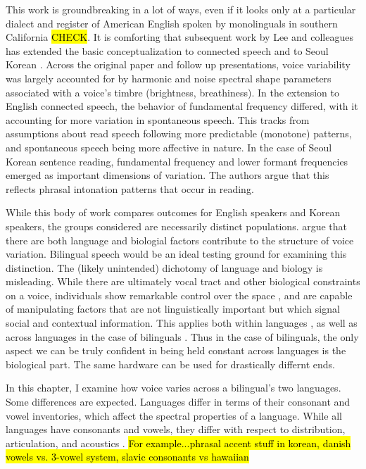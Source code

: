This work is groundbreaking in a lot of ways, even if it looks only at a particular dialect and register of American English spoken by monolinguals in southern California \hl{CHECK}. It is comforting that subsequent work by Lee and colleagues has extended the basic conceptualization to connected speech \citep{lee_2019_spontaneous} and to Seoul Korean \citep{lee_2020_language}. Across the original paper and follow up presentations, voice variability was largely accounted for by harmonic and noise spectral shape parameters associated with a voice's timbre (brightness, breathiness). In the extension to English connected speech, the behavior of fundamental frequency differed, with it accounting for more variation in spontaneous speech. This tracks from assumptions about read speech following more predictable (monotone) patterns, and spontaneous speech being more affective in nature. In the case of Seoul Korean sentence reading, fundamental frequency and lower formant frequencies emerged as important dimensions of variation. The authors argue that this reflects phrasal intonation patterns that occur in reading. 

While this body of work compares outcomes for English speakers and Korean speakers, the groups considered are necessarily distinct populations. \citet{lee_2020_language} argue that there are both language and biologial factors contribute to the structure of voice variation. Bilingual speech would be an ideal testing ground for examining this distinction. The (likely unintended) dichotomy of language and biology is misleading. While there are ultimately vocal tract and other biological constraints on a voice, individuals show remarkable control over the space \citep{}, and are capable of manipulating factors that are not linguistically important but which signal social and contextual information. This applies both within languages \citep{}, as well as across languages in the case of bilinguals \citep{bullock_2009_sociophonetics}. Thus in the case of bilinguals, the only aspect we can be truly confident in being held constant across languages is the biological part. The same hardware can be used for drastically differnt ends. 

In this chapter, I examine how voice varies across a bilingual's two languages. Some differences are expected. Languages differ in terms of their consonant and vowel inventories, which affect the spectral properties of a language. While all languages have consonants and vowels, they differ with respect to distribution, articulation, and acoustics . \hl{For example...phrasal accent stuff in korean, danish vowels vs. 3-vowel system, slavic consonants vs hawaiian} 


